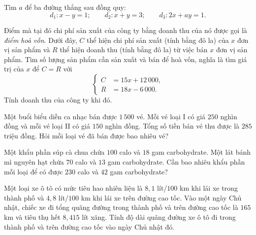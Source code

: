 \begin{practice}
\begin{questions}[resume=SBT]
        \answerline
        \answerline
        \answerline

        \item Tìm $a$ để ba đường thẳng sau đồng quy:
        \[
            d_1:x-y=1;\qquad d_2:x+y=3;\qquad d_3:2x+ay=1.
        \]

        \answerline
        \answerline

        \item Điểm mà tại đó chi phí sản xuất của công ty bằng doanh thu của nó được gọi là \emph{điểm hoà vốn}. Dưới đây, $C$ thể hiện chi phí sản xuất (tính bằng đô la) của $x$ đơn vị sản phẩm và $R$ thể hiện doanh thu (tính bằng đô la) từ việc bán $x$ đơn vị sản phẩm. Tìm số lượng sản phẩm cần sản xuất và bán để hoà vốn, nghĩa là tìm giá trị của $x$ để $C=R$ với
        \[
            \left\{
            \begin{aligned}
                C&=15x+12\,000,\\
                R&=18x-6\,000.
            \end{aligned}
            \right.
        \]
        Tính doanh thu của công ty khi đó.

        \answerline
        \answerline
        \answerline

        \item Một buổi biểu diễn ca nhạc bán được $1\,500$ vé. Mỗi vé loại I có giá $250$ nghìn đồng và mỗi vé loại II có giá $150$ nghìn đồng. Tổng số tiền bán vé thu được là $285$ triệu đồng. Hỏi mỗi loại vé đã bán được bao nhiêu vé?

        \answerline
        \answerline
        \answerline

        \item Một khẩu phần súp cà chua chứa $100$ calo và $18$ gam carbohydrate. Một lát bánh mì nguyên hạt chứa $70$ calo và $13$ gam carbohydrate. Cần bao nhiêu khẩu phần mỗi loại để có được $230$ calo và $42$ gam carbohydrate?

        \answerline
        \answerline
        \answerline

        \item Một loại xe ô tô có mức tiêu hao nhiên liệu là $8{,}1$ lít/$100$ km khi lái xe trong thành phố và $4{,}8$ lít/$100$ km khi lái xe trên đường cao tốc. Vào một ngày Chủ nhật, chiếc xe đi tổng quãng đường trong thành phố và trên đường cao tốc là $165$ km và tiêu thụ hết $8{,}415$ lít xăng. Tính độ dài quãng đường xe ô tô đi trong thành phố và trên đường cao tốc vào ngày Chủ nhật đó.

        \answerline
        \answerline
        \answerline
    \end{questions}
\end{practice}
